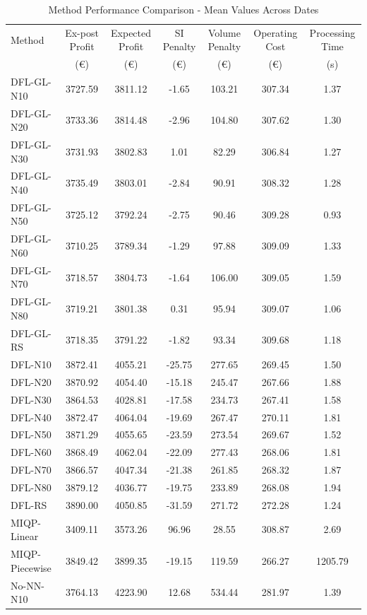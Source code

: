 \begin{table}[h]
\centering
\caption{Method Performance Comparison - Mean Values Across Dates}
\label{tab:method_comparison}
\begin{tabular}{lcccccc}
\toprule
Method & Ex-post Profit & Expected Profit & SI Penalty & Volume Penalty & Operating Cost & Processing Time \\
 & (€) & (€) & (€) & (€) & (€) & (s) \\
\midrule
DFL-GL-N10 & 3727.59 & 3811.12 & -1.65 & 103.21 & 307.34 & 1.37 \\
DFL-GL-N20 & 3733.36 & 3814.48 & -2.96 & 104.80 & 307.62 & 1.30 \\
DFL-GL-N30 & 3731.93 & 3802.83 & 1.01 & 82.29 & 306.84 & 1.27 \\
DFL-GL-N40 & 3735.49 & 3803.01 & -2.84 & 90.91 & 308.32 & 1.28 \\
DFL-GL-N50 & 3725.12 & 3792.24 & -2.75 & 90.46 & 309.28 & 0.93 \\
DFL-GL-N60 & 3710.25 & 3789.34 & -1.29 & 97.88 & 309.09 & 1.33 \\
DFL-GL-N70 & 3718.57 & 3804.73 & -1.64 & 106.00 & 309.05 & 1.59 \\
DFL-GL-N80 & 3719.21 & 3801.38 & 0.31 & 95.94 & 309.07 & 1.06 \\
DFL-GL-RS & 3718.35 & 3791.22 & -1.82 & 93.34 & 309.68 & 1.18 \\
DFL-N10 & 3872.41 & 4055.21 & -25.75 & 277.65 & 269.45 & 1.50 \\
DFL-N20 & 3870.92 & 4054.40 & -15.18 & 245.47 & 267.66 & 1.88 \\
DFL-N30 & 3864.53 & 4028.81 & -17.58 & 234.73 & 267.41 & 1.58 \\
DFL-N40 & 3872.47 & 4064.04 & -19.69 & 267.47 & 270.11 & 1.81 \\
DFL-N50 & 3871.29 & 4055.65 & -23.59 & 273.54 & 269.67 & 1.52 \\
DFL-N60 & 3868.49 & 4062.04 & -22.09 & 277.43 & 268.06 & 1.81 \\
DFL-N70 & 3866.57 & 4047.34 & -21.38 & 261.85 & 268.32 & 1.87 \\
DFL-N80 & 3879.12 & 4036.77 & -19.75 & 233.89 & 268.08 & 1.94 \\
DFL-RS & 3890.00 & 4050.85 & -31.59 & 271.72 & 272.28 & 1.24 \\
MIQP-Linear & 3409.11 & 3573.26 & 96.96 & 28.55 & 308.87 & 2.69 \\
MIQP-Piecewise & 3849.42 & 3899.35 & -19.15 & 119.59 & 266.27 & 1205.79 \\
No-NN-N10 & 3764.13 & 4223.90 & 12.68 & 534.44 & 281.97 & 1.39 \\

\end{tabular}
\end{table}
